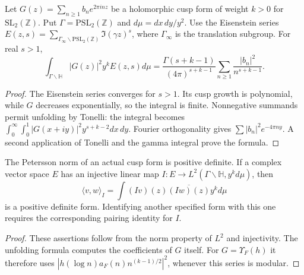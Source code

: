 \begin{theorem}
\label{v4-arith:w5-a:thm:RS-integral}
Let $G(z)=\sum_{n\ge1}b_n e^{2\pi inz}$ be a holomorphic cusp form
of weight $k>0$ for $\mathrm{SL}_2(\mathbb Z)$.
Put $\Gamma=\mathrm{PSL}_2(\mathbb Z)$ and $d\mu=dx\,dy/y^2$.
Use the Eisenstein series
$E(z,s)=\sum_{\Gamma_\infty\backslash\mathrm{PSL}_2(\mathbb Z)}
\Im(\gamma z)^s$, where $\Gamma_\infty$ is the translation subgroup.
For real $s>1$,
\begin{equation}
 \int_{\Gamma\backslash\mathbb H}|G(z)|^2y^kE(z,s)d\mu
 =\frac{\Gamma(s+k-1)}{(4\pi)^{s+k-1}}
       \sum_{n\ge1}\frac{|b_n|^2}{n^{s+k-1}}.
 \label{v4-arith:w5-a:eq:KF-kernel}
\end{equation}
\end{theorem}
\begin{proof}
The Eisenstein series converges for $s>1$. Its cusp growth is
polynomial, while $G$ decreases exponentially, so the integral is
finite. Nonnegative summands permit unfolding by Tonelli:
the integral becomes
$\int_0^\infty\int_0^1|G(x+iy)|^2y^{s+k-2}dx\,dy$.
Fourier orthogonality gives $\sum|b_n|^2e^{-4\pi ny}$.
A second application of Tonelli and the gamma integral prove the formula.
\end{proof}

\begin{proposition}
\label{v4-arith:w5-a:thm:petersson-positive}
The Petersson norm of an actual cusp form is positive definite.
If a complex vector space $E$ has an injective linear map
$I:E\to L^2(\Gamma\backslash\mathbb H,y^k d\mu)$, then
\begin{equation}
 \langle v,w\rangle_I=\int (Iv)(z)\overline{(Iw)(z)}y^k d\mu
 \label{v4-arith:w5-a:eq:petersson}
\end{equation}
is a positive definite form. Identifying another specified form
with this one requires the corresponding pairing identity for $I$.
\end{proposition}
\begin{proof}
These assertions follow from the norm property of $L^2$ and
injectivity. The unfolding formula computes the coefficients
of $G$ itself. For $G=\Upsilon_F(h)$ it therefore uses
$|h(\log n)a_F(n)n^{(k-1)/2}|^2$, whenever this series is modular.
\end{proof}


